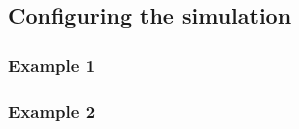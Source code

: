 
\subsection{Configuring the simulation}


\subsubsection{Example 1}\label{sec:example1}


\subsubsection{Example 2}\label{sec:example2}
